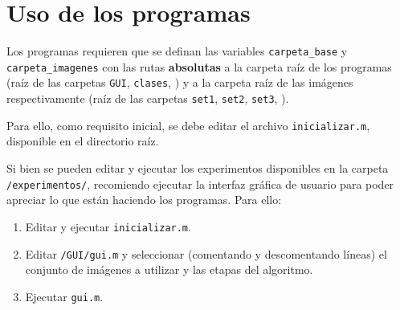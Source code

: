 \chapter{Uso de los programas}\label{anexo2}

Los programas requieren que se definan las variables \texttt{carpeta\_base} y \texttt{carpeta\_imagenes} con las rutas \textbf{absolutas} a la carpeta raíz de los programas (raíz de las carpetas \texttt{GUI}, \texttt{clases}, \textellipsis) y a la carpeta raíz de las imágenes respectivamente (raíz de las carpetas \texttt{set1}, \texttt{set2}, \texttt{set3}, \textellipsis).


Para ello, como requisito inicial, se debe editar el archivo \texttt{inicializar.m}, disponible en el directorio raíz.

Si bien se pueden editar y ejecutar los experimentos disponibles en la carpeta \texttt{/experimentos/}, recomiendo ejecutar la interfaz gráfica de usuario para poder apreciar lo que están haciendo los programas. Para ello:

\begin{enumerate}
\item Editar y ejecutar \texttt{inicializar.m}.
\item Editar \texttt{/GUI/gui.m} y seleccionar (comentando y descomentando líneas) el conjunto de imágenes a utilizar y las etapas del algoritmo.
\item Ejecutar \texttt{gui.m}.
\end{enumerate}
